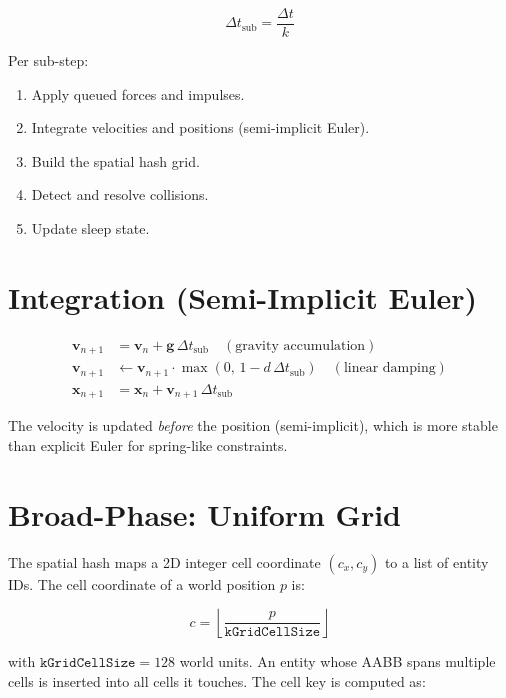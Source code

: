 \documentclass[12pt, a4paper]{report}
\theoremstyle{definition}
\theoremstyle{remark}
\begin{document}
\begin{equation}
\Delta t_\text{sub} = \frac{\Delta t}{k}
\end{equation}

Per sub-step:
\begin{enumerate}
  \item Apply queued forces and impulses.
  \item Integrate velocities and positions (semi-implicit Euler).
  \item Build the spatial hash grid.
  \item Detect and resolve collisions.
  \item Update sleep state.
\end{enumerate}

\section{Integration (Semi-Implicit Euler)}

\begin{align}
  \mathbf{v}_{n+1} &= \mathbf{v}_n + \mathbf{g}\,\Delta t_\text{sub}
                    \quad (\text{gravity accumulation}) \\
  \mathbf{v}_{n+1} &\leftarrow \mathbf{v}_{n+1} \cdot \max(0,\, 1 - d\,\Delta t_\text{sub})
                    \quad (\text{linear damping}) \\
  \mathbf{x}_{n+1} &= \mathbf{x}_n + \mathbf{v}_{n+1}\,\Delta t_\text{sub}
\end{align}

The velocity is updated \emph{before} the position (semi-implicit),
which is more stable than explicit Euler for spring-like constraints.

\section{Broad-Phase: Uniform Grid}

The spatial hash maps a 2D integer cell coordinate $(c_x, c_y)$ to a
list of entity IDs. The cell coordinate of a world position $p$ is:

\begin{equation}
c = \left\lfloor \frac{p}{\texttt{kGridCellSize}} \right\rfloor
\end{equation}

with $\texttt{kGridCellSize} = 128$ world units. An entity whose AABB
spans multiple cells is inserted into all cells it touches. The cell key
is computed as:
\end{document}
